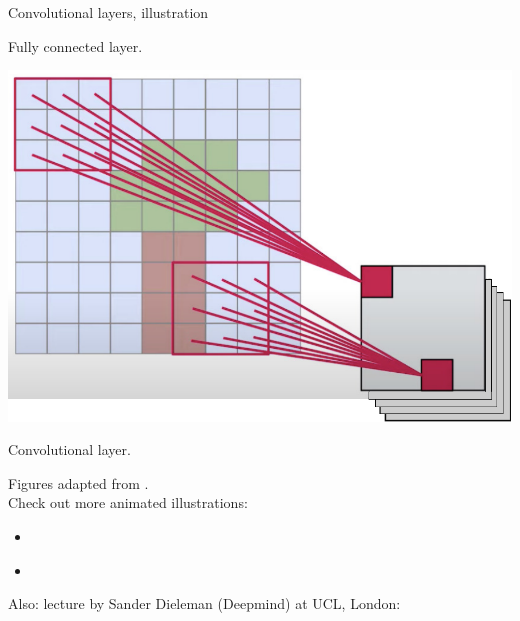 \begin{frame}{Convolutional layers, illustration}
\begin{minipage}{0.35\linewidth}
\begin{center}
  \end{center}
Fully connected layer.
\end{minipage}
\hspace{1mm}
\begin{minipage}{0.35\linewidth}
  \begin{center}
    \includegraphics[height=0.4\textheight]{figures/convnet_v2.pdf}
  \end{center}
Convolutional layer.
\end{minipage}
\vfill
\scriptsize{Figures adapted from .}\\
\vsp
\vsp
\normalsize{Check out more animated illustrations:}
\begin{itemize}
\item {}\\
\item {}
\end{itemize}
Also: lecture by Sander Dieleman (Deepmind) at UCL, London:

\end{frame}

